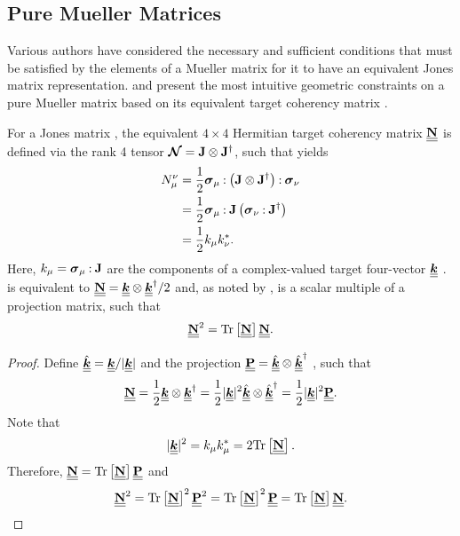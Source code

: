 
\subsection{ Pure Mueller Matrices }
\label{app:pure_Mueller_matrices}
%
Various authors \cite[e.g.,][]{barakat81,sim82,clo86} have considered the necessary and sufficient conditions that must be satisfied by the elements of a Mueller matrix for it to have an equivalent Jones matrix representation.
%
\cite{sim82} and \cite{clo86} present the most intuitive geometric constraints on 
a pure Mueller matrix based on its equivalent target coherency matrix \citep{clo86}.

For a Jones matrix , the equivalent $4 \times 4$ Hermitian target coherency matrix $\MM{N}$ is defined via the rank 4 tensor $\JT{N}=\outerBilinear{\bf J}{\bf J}^\dagger$, such that
 yields
%
\begin{equation}
\begin{split}
\label{eqn:target_coherency_matrix}
N_\irow^\icol
& = \frac{1}{2} \dc{\pauli{\irow}}{\dc{\left( \outerBilinear{\bf J}{\bf J}^\dagger \right)}{\pauli{\icol}}} \\
& = \frac{1}{2} \dc{\pauli{\irow}}{{\bf J}} \left( \dc{\pauli{\icol}}{{\bf J}^\dagger} \right) \\
& = \frac{1}{2} k_\irow k^*_\icol.
\end{split}
\end{equation}
%
Here, $k_\irow = \dc{\pauli{\irow}}{{\bf J}}$ are the components of a complex-valued target four-vector $\Sv{k}$ \citep{clo86}.
%
 is equivalent to $\MM{N} = \Sv{k} \otimes \Sv{k}^\dagger / 2$ and, as
noted by \cite{sim82},  is a scalar multiple of a projection matrix, such that
\begin{equation}
\MM{N}^2 = \tr{\MM{N}} \MM{N}.
\label{eqn:pure_target_coherency}
\end{equation}

\begin{proof}
Define $\hat{\Sv{k}}=\Sv{k}/|\Sv{k}|$ and the projection $\MM{P} = \hat{\Sv{k}} \otimes \hat{\Sv{k}}^\dagger$ , 
such that
\begin{equation*}
\MM{N}
 = \frac{1}{2}\Sv{k} \otimes \Sv{k}^\dagger \\
 = \frac{1}{2}|\Sv{k}|^2 \hat{\Sv{k}} \otimes \hat{\Sv{k}}^\dagger
 = \frac{1}{2}|\Sv{k}|^2 \MM{P}.
\end{equation*}
Note that 
\begin{equation*}
|\Sv{k}|^2 = k_\mu k_\mu^* = 2 \tr{\MM{N}}.
\end{equation*}
Therefore, $\MM{N} = \tr{\MM{N}} \MM{P}$ and 
\begin{equation*}
\MM{N}^2 = \tr{\MM{N}}^2 \MM{P}^2 = \tr{\MM{N}}^2 \MM{P}= \tr{\MM{N}} \MM{N}.
\end{equation*}
\end{proof}


